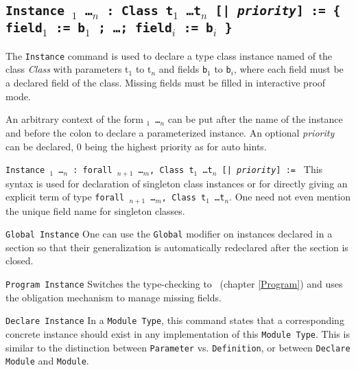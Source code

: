 \subsection{\tt Instance {\ident} {\binder$_1$ \ldots \binder$_n$} :
  {Class} {t$_1$ \ldots t$_n$} [| \textit{priority}]
  := \{ field$_1$ := b$_1$ ; \ldots ; field$_i$ := b$_i$ \}}
\label{Instance}

The \texttt{Instance} command is used to declare a type class instance
named {\ident} of the class \emph{Class} with parameters {t$_1$} to {t$_n$} and
fields {\tt b$_1$} to {\tt b$_i$}, where each field must be a declared
field of the class. Missing fields must be filled in interactive proof mode.

An arbitrary context of the form {\tt \binder$_1$ \ldots \binder$_n$}
can be put after the name of the instance and before the colon to
declare a parameterized instance.
An optional \textit{priority} can be declared, 0 being the highest
priority as for auto hints.

\begin{Variants}
\item {\tt Instance {\ident} {\binder$_1$ \ldots \binder$_n$} :
    forall {\binder$_{n+1}$ \ldots \binder$_m$},
    {Class} {t$_1$ \ldots t$_n$} [| \textit{priority}] := \term} 
  This syntax is used for declaration of singleton class instances or
  for directly giving an explicit term of type
  {\tt forall {\binder$_{n+1}$ \ldots \binder$_m$}, {Class} {t$_1$ \ldots t$_n$}}.
  One need not even mention the unique field name for singleton classes.

\item {\tt Global Instance} One can use the \texttt{Global} modifier on
  instances declared in a section so that their generalization is automatically
  redeclared after the section is closed.

\item {\tt Program Instance} 
  Switches the type-checking to \Program~(chapter \ref{Program})
  and uses the obligation mechanism to manage missing fields.

\item {\tt Declare Instance} 
  In a {\tt Module Type}, this command states that a corresponding
  concrete instance should exist in any implementation of this
  {\tt Module Type}. This is similar to the distinction between
  {\tt Parameter} vs. {\tt Definition}, or between {\tt Declare Module}
  and {\tt Module}.

\end{Variants}

